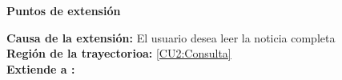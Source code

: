 

\begin{large}
	\textbf{Puntos de extensión}\\
\end{large}	

\textbf{Causa de la extensión:} El usuario desea leer la noticia completa\\
\textbf{Región de la trayectorioa:} \ref{CU2:Consulta}\\
\textbf{Extiende a :} \\\\